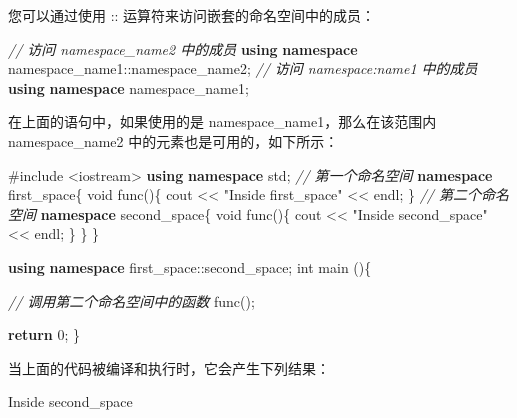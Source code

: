\documentclass[
]{article}
\newenvironment{Shaded}{}{}
\newcommand{\CommentTok}[1]{\textcolor[rgb]{0.38,0.63,0.69}{\textit{#1}}}
\newcommand{\ControlFlowTok}[1]{\textcolor[rgb]{0.00,0.44,0.13}{\textbf{#1}}}
\newcommand{\DataTypeTok}[1]{\textcolor[rgb]{0.56,0.13,0.00}{#1}}
\newcommand{\DecValTok}[1]{\textcolor[rgb]{0.25,0.63,0.44}{#1}}
\newcommand{\ImportTok}[1]{#1}
\newcommand{\KeywordTok}[1]{\textcolor[rgb]{0.00,0.44,0.13}{\textbf{#1}}}
\newcommand{\NormalTok}[1]{#1}
\newcommand{\OperatorTok}[1]{\textcolor[rgb]{0.40,0.40,0.40}{#1}}
\newcommand{\PreprocessorTok}[1]{\textcolor[rgb]{0.74,0.48,0.00}{#1}}
\newcommand{\StringTok}[1]{\textcolor[rgb]{0.25,0.44,0.63}{#1}}
\begin{document}
您可以通过使用 :: 运算符来访问嵌套的命名空间中的成员：

\begin{Shaded}
\begin{Highlighting}[]
\CommentTok{// 访问 namespace\_name2 中的成员}
\KeywordTok{using} \KeywordTok{namespace}\NormalTok{ namespace\_name1}\OperatorTok{::}\NormalTok{namespace\_name2}\OperatorTok{;}
\CommentTok{// 访问 namespace:name1 中的成员}
\KeywordTok{using} \KeywordTok{namespace}\NormalTok{ namespace\_name1}\OperatorTok{;}
\end{Highlighting}
\end{Shaded}

在上面的语句中，如果使用的是 namespace\_name1，那么在该范围内
namespace\_name2 中的元素也是可用的，如下所示：

\begin{Shaded}
\begin{Highlighting}[]
\PreprocessorTok{\#include }\ImportTok{\textless{}iostream\textgreater{}}
\KeywordTok{using} \KeywordTok{namespace}\NormalTok{ std}\OperatorTok{;}
\CommentTok{// 第一个命名空间}
\KeywordTok{namespace}\NormalTok{ first\_space}\OperatorTok{\{}
   \DataTypeTok{void}\NormalTok{ func}\OperatorTok{()\{}
\NormalTok{      cout }\OperatorTok{\textless{}\textless{}} \StringTok{"Inside first\_space"} \OperatorTok{\textless{}\textless{}}\NormalTok{ endl}\OperatorTok{;}
   \OperatorTok{\}}
   \CommentTok{// 第二个命名空间}
   \KeywordTok{namespace}\NormalTok{ second\_space}\OperatorTok{\{}
      \DataTypeTok{void}\NormalTok{ func}\OperatorTok{()\{}
\NormalTok{         cout }\OperatorTok{\textless{}\textless{}} \StringTok{"Inside second\_space"} \OperatorTok{\textless{}\textless{}}\NormalTok{ endl}\OperatorTok{;}
      \OperatorTok{\}}
   \OperatorTok{\}}
\OperatorTok{\}}

\KeywordTok{using} \KeywordTok{namespace}\NormalTok{ first\_space}\OperatorTok{::}\NormalTok{second\_space}\OperatorTok{;}
\DataTypeTok{int}\NormalTok{ main }\OperatorTok{()\{}
 
   \CommentTok{// 调用第二个命名空间中的函数}
\NormalTok{   func}\OperatorTok{();}
   
   \ControlFlowTok{return} \DecValTok{0}\OperatorTok{;}
\OperatorTok{\}}
\end{Highlighting}
\end{Shaded}

当上面的代码被编译和执行时，它会产生下列结果：

\begin{Shaded}
\begin{Highlighting}[]
\NormalTok{Inside second\_space}
\end{Highlighting}
\end{Shaded}
\end{document}
